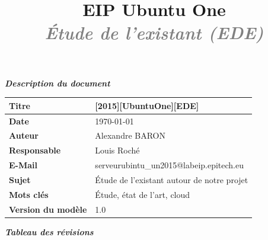\documentclass[12pt]{report}
\title{
	\huge{\textbf{\textcolor{epiBlue}{EIP Ubuntu One} } }\\
	\Large{\textbf{\emph{\textcolor{gray}{Étude de l'existant (EDE)} } } }
}
\newcommand{\DocTitle}{[2015][UbuntuOne][EDE]}
\begin{document}
\maketitle



\thispagestyle{empty}
\vspace*{10mm}
\textbf{\emph{\textcolor{epiBlue}{Description du document} } }\\

\begin{tabular}{|>{\columncolor[gray]{0.85}\color{epiBlue} \bfseries } l|l|}
\hline
	Titre & \DocTitle\\
\hline
	Date & \dashDate\today \\
\hline
	Auteur & Alexandre BARON\\
\hline
	Responsable & Louis Roché\\
\hline
	E-Mail & serveurubintu\_un2015@labeip.epitech.eu\\
\hline
	Sujet & Étude de l'existant autour de notre projet\\
\hline
	Mots clés & Étude, état de l'art, cloud\\
\hline
	Version du modèle & 1.0\\
\hline
\end{tabular}
\vspace*{10mm}

\textbf{\emph{\textcolor{epiBlue}{Tableau des révisions} } }\\
\end{document}
